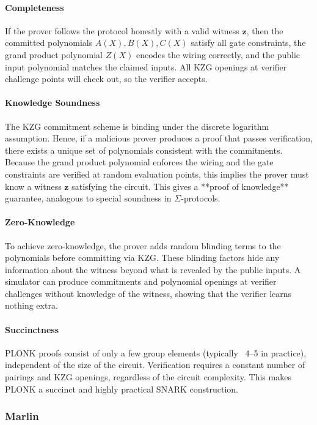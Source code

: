 \myspace

\paragraph{Completeness}
If the prover follows the protocol honestly with a valid witness $\mathbf{z}$, 
then the committed polynomials $A(X),B(X),C(X)$ satisfy all gate constraints, 
the grand product polynomial $Z(X)$ encodes the wiring correctly, 
and the public input polynomial matches the claimed inputs.  
All KZG openings at verifier challenge points will check out, so the verifier accepts.

\paragraph{Knowledge Soundness}
The KZG commitment scheme is binding under the discrete logarithm assumption.  
Hence, if a malicious prover produces a proof that passes verification, 
there exists a unique set of polynomials consistent with the commitments.  
Because the grand product polynomial enforces the wiring and the gate constraints 
are verified at random evaluation points, this implies the prover must know 
a witness $\mathbf{z}$ satisfying the circuit.  
This gives a **proof of knowledge** guarantee, analogous to special soundness in $\Sigma$-protocols.

\paragraph{Zero-Knowledge}
To achieve zero-knowledge, the prover adds random blinding terms to the 
polynomials before committing via KZG.  
These blinding factors hide any information about the witness beyond what is revealed 
by the public inputs.  
A simulator can produce commitments and polynomial openings at verifier challenges 
without knowledge of the witness, showing that the verifier learns nothing extra.

\paragraph{Succinctness}
PLONK proofs consist of only a few group elements (typically ~4–5 in practice), 
independent of the size of the circuit.  
Verification requires a constant number of pairings and KZG openings, 
regardless of the circuit complexity.  
This makes PLONK a succinct and highly practical SNARK construction.


\subsubsection{Marlin}

